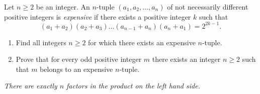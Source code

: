 Let $n\geq2$ be an integer. An $n$-tuple $(a_1,a_2,\dots,a_n)$ of not necessarily different positive integers is \emph{expensive} if there exists a positive integer $k$ such that $$(a_1+a_2)(a_2+a_3)\dots(a_{n-1}+a_n)(a_n+a_1)=2^{2k-1}.$$

\begin{enumerate}[label=\alph*)]
	\item Find all integers $n\geq2$ for which there exists an expensive $n$-tuple.
	\item Prove that for every odd positive integer $m$ there exists an integer $n\geq2$ such that $m$ belongs to an expensive $n$-tuple.
\end{enumerate}

\emph{There are exactly $n$ factors in the product on the left hand side.}